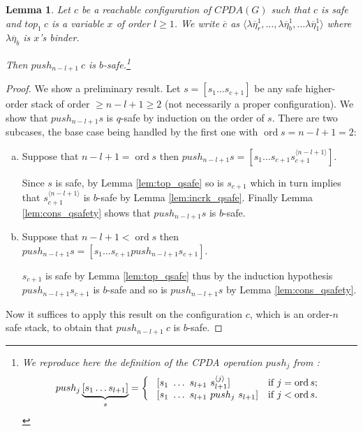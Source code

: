 \documentclass{article}
\newcommand{\ord}{\mathop{\mathrm{ord}}}
\newtheorem{lemma}{Lemma}[section]
\theoremstyle{remark}
\theoremstyle{definition}
\newcommand\orddec\overline
\begin{document}
\begin{lemma}
\label{lem:pushj_safe_implies_b-safe} Let $c$ be a reachable
configuration of $CPDA(G)$ such that $c$ is \emph{safe} and $top_1\
c$ is a variable $x$ of order $l\geq 1$. We write $\orddec{c}$ as
$\langle \lambda \overline{\eta}_r^1 , \ldots, \lambda \overline{\eta}_b^1 , \ldots \lambda
\overline{\eta}_1^1   \rangle$ where $\lambda \overline{\eta}_b$ is $x$'s binder.

Then $push_{n-l+1}\ c$ is $b$-safe.\footnote{We reproduce here the definition of the
CPDA operation $push_j$ from \cite{hague-sto07}:
$$ push_j \underbrace{[ s_1 \ldots s_{l+1} ]}_{s} =
\left\{
  \begin{array}{ll}
\    [s_1\ \ldots\ s_{l+1}\ s_{l+1}^{\langle j \rangle}]  &\hbox{if $j = \ord{s}$;}\\
\    [s_1\ \ldots\ s_{l+1}\ push_j\ s_{l+1}]  &\hbox{if $j<\ord{s}$.}
 \end{array}
\right.
$$}
\end{lemma}
\begin{proof}
We show a preliminary result.
    Let $s=[s_1 \ldots s_{c+1}]$ be any safe higher-order stack of order
    $\geq n-l+1 \geq 2$ (not necessarily a proper configuration). We
    show that $push_{n-l+1} s$ is $q$-safe by induction on the order of
    $s$. There are two subcases, the base case being handled by the
    first one with $\ord{s} = n-l+1 = 2$:
    \begin{enumerate}[a.]
      \item Suppose that $n-l+1 = \ord{s}$ then
    $push_{n-l+1} s = [ s_1 \ldots s_{c+1} s_{c+1}^{\langle n-l+1
    \rangle}]$.

    Since $s$ is safe, by Lemma \ref{lem:top_qsafe} so is $s_{c+1}$
    which in turn implies that $s_{c+1}^{\langle n-l+1\rangle}$ is
    $b$-safe by Lemma \ref{lem:incrk_qsafe}. Finally Lemma
    \ref{lem:cons_qsafety} shows that  $push_{n-l+1} s$ is $b$-safe.

      \item Suppose that $n-l+1 < \ord{s}$ then
    $push_{n-l+1} s = [ s_1 \ldots s_{c+1} push_{n-l+1} s_{c+1}]$.

    $s_{c+1}$ is safe by Lemma \ref{lem:top_qsafe} thus by the
    induction hypothesis $push_{n-l+1} s_{c+1}$ is $b$-safe and so
    is $push_{n-l+1} s$ by Lemma \ref{lem:cons_qsafety}.
        \end{enumerate}
    Now it suffices to apply this result on the configuration $c$, which
    is an order-$n$ safe stack, to obtain that $push_{n-l+1}\ c$ is
    $b$-safe.
\end{proof}
\end{document}
